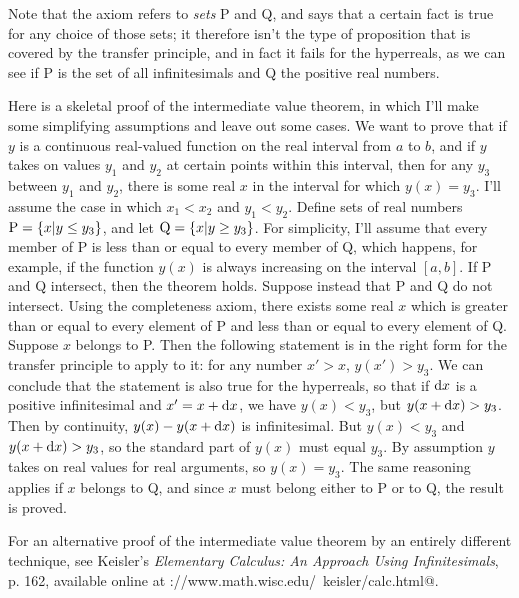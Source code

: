 Note that the axiom
refers to \emph{sets} P and Q, and says that a certain fact is true for any choice of those sets;
it therefore isn't the type of proposition that is covered by the transfer principle, and in fact
it fails for the hyperreals, as we can see if P is the set of all infinitesimals and Q the
positive real numbers.

Here is a skeletal proof of the intermediate value theorem, in which I'll make some simplifying
assumptions and leave out some cases. We want to prove that if $y$ is a continuous real-valued function on the real interval from $a$ to $b$,
and if $y$ takes on values $y_1$ and $y_2$ at certain points within this interval, then for any $y_3$ between $y_1$ and
$y_2$, there is some real $x$ in the interval for which $y(x)=y_3$.
I'll assume the case in which $x_1<x_2$ and $y_1<y_2$.
Define sets of real numbers $\textup{P}=\{x|y \le y_3\}$, and let $\textup{Q}=\{x|y \ge y_3\}$.
For simplicity, I'll assume that every member of P is less than or equal to
every member of Q, which happens, for example, if the function $y(x)$ is always increasing
on the interval $[a,b]$. If P and Q intersect, then the theorem holds.
Suppose instead that P and Q do not intersect.
Using the completeness axiom, there exists some real $x$ which is greater than or equal
to every element of P and less than or equal to every element of Q.
Suppose $x$ belongs to P.
Then the following
statement is in the right form for the transfer principle to apply to it: for any number
$x'>x$, $y(x')>y_3$. We can conclude that the statement is also true for the hyperreals,
so that if $\textup{d} x$ is a positive infinitesimal and $x'=x+\textup{d} x$, we have $y(x)<y_3$, but $y(x+\textup{d} x)>y_3$.
Then by continuity, $y(x)-y(x+\textup{d} x)$ is infinitesimal. But $y(x)<y_3$ and
$y(x+\textup{d} x)>y_3$, so the standard part of $y(x)$ must equal $y_3$. By assumption $y$ takes on real values
for real arguments, so $y(x)=y_3$. The same reasoning applies if $x$ belongs to Q, and since
$x$ must belong either to P or to Q, the result is proved.

For an alternative proof of the
intermediate value theorem by an entirely different technique, see Keisler's
\emph{Elementary Calculus: An Approach Using Infinitesimals}, p. 162, available online at
\verb@http://www.math.wisc.edu/~keisler/calc.html@.

